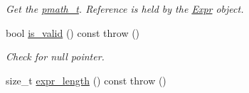 \begin{CompactItemize}
\begin{CompactList}\small\item\em Get the \hyperlink{classpmath__t}{pmath\_\-t}. Reference is held by the \hyperlink{classpmath_1_1_expr}{Expr} object. \item\end{CompactList}\item 
\hypertarget{classpmath_1_1_expr_94c201f2b580079d43fc75d1479bab2a}{
bool \hyperlink{classpmath_1_1_expr_94c201f2b580079d43fc75d1479bab2a}{is\_\-valid} () const   throw ()}
\label{classpmath_1_1_expr_94c201f2b580079d43fc75d1479bab2a}

\begin{CompactList}\small\item\em Check for null pointer. \item\end{CompactList}\item 
\hypertarget{classpmath_1_1_expr_1c8347cf339bc5bf4c593542c7ba6772}{
size\_\-t \hyperlink{classpmath_1_1_expr_1c8347cf339bc5bf4c593542c7ba6772}{expr\_\-length} () const   throw ()}
\label{classpmath_1_1_expr_1c8347cf339bc5bf4c593542c7ba6772}


\end{CompactItemize}
